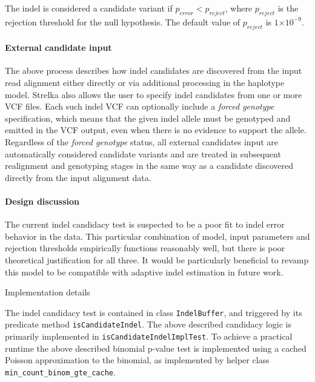 \documentclass{article}
\let\IncludeDevelopmentDetail
\newenvironment{raggedParagraph}[1]
{
    \begin{paragraph} {#1}
        \raggedright
    }
    {
    \end{paragraph}
}
\newcommand{\e}[1]{\ensuremath{\times 10^{#1}}}
\begin{document}
\noindent The indel is considered a candidate variant if $p_{error} < p_{reject}$, where $p_{reject}$ is the rejection threshold for the null hypothesis. The default value of $p_{reject}$ is $1\e{-9}$.

\paragraph{External candidate input}

The above process describes how indel candidates are discovered from the input read alignment either directly or via additional processing in the haplotype model. Strelka also allows the user to specify indel candidates from one or more VCF files. Each such indel VCF can optionally include a \emph{forced genotype} specification, which means that the given indel allele must be genotyped and emitted in the VCF output, even when there is no evidence to support the allele. Regardless of the \emph{forced genotype} status, all external candidates input are automatically considered candidate variants and are treated in subsequent realignment and genotyping stages in the same way as a candidate discovered directly from the input alignment data.

\ifx\IncludeDevelopmentDetail

\paragraph{Design discussion}

The current indel candidacy test is suspected to be a poor fit to indel error behavior in the data. This particular combination of model, input parameters and rejection thresholds empirically functions reasonably well, but there is poor theoretical justification for all three. It would be particularly beneficial to revamp this model to be compatible with adaptive indel estimation in future work.


\begin{raggedParagraph}{Implementation details}

The indel candidacy test is contained in class \verb|IndelBuffer|, and triggered by its predicate method \verb|isCandidateIndel|. The above described candidacy logic is primarily implemented in \verb|isCandidateIndelImplTest|. To achieve a practical runtime the above described binomial p-value test is implemented using a cached Poisson approximation to the binomial, as implemented by helper class \verb|min_count_binom_gte_cache|.

\end{raggedParagraph}
\end{document}
